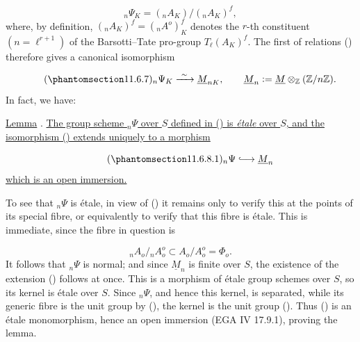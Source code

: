 \begin{equation*}
{}_n\Psi_K=({}_nA_K)/({}_nA_K)^f,
\end{equation*}
where, by definition,
$({}_nA_K)^f=({}_nA^o)^f_K$ denotes the $r$-th constituent
$(n=\ell^{r+1})$ of the Barsotti--Tate pro-group
$T_\ell(A_K)^f$. The first of relations () therefore gives a
canonical isomorphism

\begin{equation}\tag{\SGARefTarget{sga7.sga7i.eix.n11-6-7}{11.6.7}}
{}_n\Psi_K\xrightarrow{\ \sim\ }\underline M_{nK},
\qquad
\underline M_n\mathrel{\mathop:}=\underline M
 \otimes_{\mathbb Z}(\mathbb Z/n\mathbb Z).
\end{equation}
In fact, we have:

\medskip
\noindent
\underline{Lemma} . \underline{The group scheme ${}_n\Psi$ over
$S$ defined in () is \emph{\'etale} over $S$, and the isomorphism
() extends uniquely to a morphism}

\begin{equation}\tag{\SGARefTarget{sga7.sga7i.eix.n11-6-8-1}{11.6.8.1}}
{}_n\Psi\lhook\joinrel\longrightarrow\underline M_n
\end{equation}
\underline{which is an open immersion.}

To see that ${}_n\Psi$ is \'etale, in view of () it remains only
to verify this at the points of its special fibre, or equivalently to
verify that this fibre is \'etale. This is immediate, since the fibre in
question is

\begin{equation*}
{}_nA_o/{}_nA_o^o\subset A_o/A_o^o=\Phi_o.
\end{equation*}
It follows that ${}_n\Psi$ is normal; and since $\underline M_n$ is
finite over $S$, the existence of the extension () follows at
once. This is a morphism of \'etale group schemes over $S$, so its
kernel is \'etale over $S$. Since ${}_n\Psi$, and hence this kernel, is
separated, while its generic fibre is the unit group by (), the
kernel is the unit group (). Thus () is an \'etale
monomorphism, hence an open immersion (EGA IV 17.9.1), proving the lemma.

